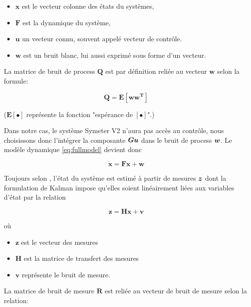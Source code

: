\documentclass[12pt,a4paper]{report}
\begin{document}
	\begin{itemize}
	\item $\boldsymbol{x}$ est le vecteur colonne des états du systèmes, 
	\item $\boldsymbol{F}$ est la dynamique du système, 
	\item $\boldsymbol{u}$  un vecteur connu, souvent appelé vecteur de contrôle.
	\item $\boldsymbol{w}$ est un bruit blanc, lui aussi exprimé sous forme d'un vecteur.
	\end{itemize}

	La matrice de bruit de process \(\boldsymbol{Q}\) est par définition reliée au vecteur \(\boldsymbol{w}\) selon la formule:

	\begin{equation}
		\boldsymbol{Q = E[ww^T]}
	\end{equation}

	($\boldsymbol{E[\bullet]}$ représente la fonction "espérance de \([\bullet]\)".)
	
	\para Dans notre cas, le système Symeter V2 n'aura pas accès au contrôle, nous choisissons donc l'intégrer la composante $\boldsymbol{Gu}$ dans le bruit de process $\boldsymbol{w}$. Le modèle dynamique \ref{eq:fullmodel} devient donc 
	
	\begin{equation}
		\label{eq:actualmodel}
			\boldsymbol{
			\dot{x} = Fx + w
		}
	\end{equation}

	\para Toujours selon \cite{zarchan_fundamentals_2009}, l'état du système est estimé à partir de mesures $\boldsymbol{z}$ dont la formulation de Kalman impose qu'elles soient linéairement liées aux variables d'état par la relation 

	\begin{equation}
		\label{eq:mesure_cont}
		\boldsymbol{z=Hx + v}
	\end{equation}

	où

	\begin{itemize}
		\item
		\(\boldsymbol{z}\) est le vecteur des mesures
		\item
		\(\boldsymbol{H}\) est la matrice de transfert des mesures
		\item
		\(\boldsymbol{v}\) représente le bruit de mesure.
	\end{itemize}

	La matrice de bruit de mesure \(\boldsymbol{R}\) est reliée au vecteur	de bruit de mesure selon la relation:
\end{document}
